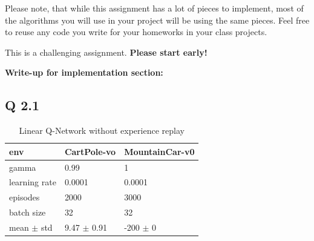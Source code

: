 \documentclass[12pt]{article}
\begin{document}
Please note, that while this assignment has a lot of pieces to implement, most of the algorithms you will use in your project will be using the same pieces. Feel free to reuse any code you write for your
homeworks in your class projects.


This is a challenging assignment. 
\textbf{Please start early!}


\nocite{*}




\newpage
\textbf{Write-up for implementation section: }

\subsection*{Q 2.1}
\begin{table}[h!]
\centering
\caption{Linear Q-Network without experience replay}
\label{tab:lwoexp}
\begin{tabular}{|l|l|l|}
\hline
env           & CartPole-vo & MountainCar-v0 \\ \hline
gamma         & 0.99        &    1            \\ \hline
learning rate & 0.0001      &           0.0001     \\ \hline
episodes      & 2000        &       3000         \\ \hline
batch size      & 32        &       32         \\ \hline
mean $\pm$ std  & 9.47 $\pm$ 0.91 &   -200 $\pm$ 0\\ \hline
\end{tabular}
\end{table}
\end{document}
